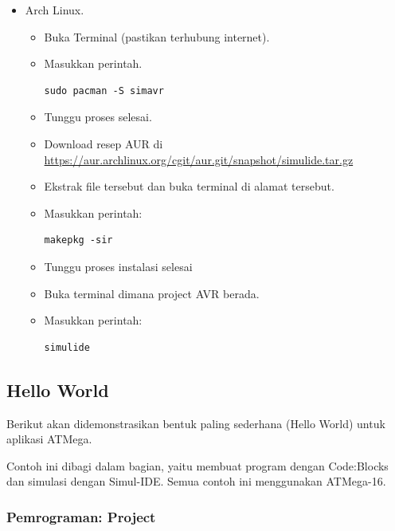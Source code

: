 \documentclass[12pt,]{article}
\begin{document}
\begin{itemize}
		\item Arch Linux.
		\begin{itemize}
			\item Buka Terminal (pastikan terhubung internet).
			\item Masukkan perintah.
			\begin{verbatim}
sudo pacman -S simavr
			\end{verbatim}
			\item Tunggu proses selesai.
			\item Download resep AUR di \url{https://aur.archlinux.org/cgit/aur.git/snapshot/simulide.tar.gz}
			\item Ekstrak file tersebut dan buka terminal di alamat tersebut.
			\item Masukkan perintah:
			\begin{verbatim}
makepkg -sir
			\end{verbatim}
			\item Tunggu proses instalasi selesai
			\item Buka terminal dimana project AVR berada.
			\item Masukkan perintah:
			\begin{verbatim}
simulide
			\end{verbatim}
		\end{itemize}
		
	\end{itemize}

	\newpage
	\subsection{Hello World}
	
	Berikut akan didemonstrasikan bentuk paling sederhana (Hello World) untuk aplikasi ATMega.
	
	Contoh ini dibagi dalam bagian, yaitu membuat program dengan Code:Blocks dan simulasi dengan Simul-IDE.
	Semua contoh ini menggunakan ATMega-16.
	
	\subsubsection{Pemrograman: Project}
	
\end{document}
